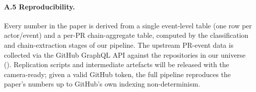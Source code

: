 \paragraph{A.5 Reproducibility.}
Every number in the paper is derived from a single event-level table (one row per actor/event) and a per-PR chain-aggregate table, computed by the classification and chain-extraction stages of our pipeline. The upstream PR-event data is collected via the GitHub GraphQL API against the \PLACEHOLDERNREPOS{} repositories in our universe (). Replication scripts and intermediate artefacts will be released with the camera-ready; given a valid GitHub token, the full pipeline reproduces the paper's numbers up to GitHub's own indexing non-determinism.
